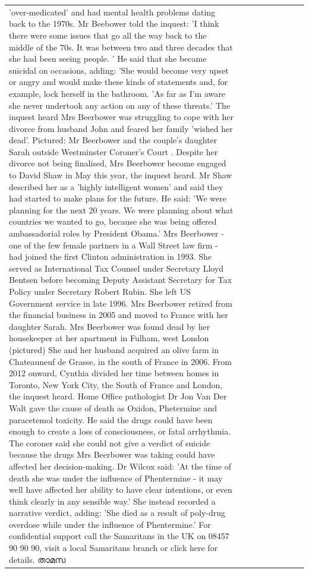 \begin{table}[H]
\begin{tabular}{lllrlllll}
'over-medicated' and had mental health problems dating back to the 1970s. Mr Beebower told the inquest: 'I think there were some issues that go all the way back to the middle of the 70s. It was between two and three decades that she had been seeing people. ' He said that she became suicidal on occasions, adding: 'She would become very upset or angry and would make these kinds of statements and, for example, lock herself in the bathroom. 'As far as I'm aware she never undertook any action on any of these threats.' The inquest heard Mrs Beerbower was struggling to cope with her divorce from husband John and feared her family 'wished her dead'. Pictured: Mr Beerbower and the couple's daughter Sarah outside Westminster Coroner's Court . Despite her divorce not being finalised, Mrs Beerbower become engaged to David Shaw in May this year, the inquest heard. Mr Shaw described her as a 'highly intelligent women' and said they had started to make plans for the future. He said: 'We were planning for the next 20 years. We were planning about what countries we wanted to go, because she was being offered ambassadorial roles by President Obama.' Mrs Beerbower - one of the few female partners in a Wall Street law firm - had joined the first Clinton administration in 1993. She served as International Tax Counsel under Secretary Lloyd Bentsen before becoming Deputy Assistant Secretary for Tax Policy under Secretary Robert Rubin. She left US Government service in late 1996. Mrs Beerbower retired from the financial business in 2005 and moved to France with her daughter Sarah. Mrs Beerbower was found dead by her housekeeper at her apartment in Fulham, west London (pictured) She and her husband acquired an olive farm in Chateauneuf de Grasse, in the south of France in 2006. From 2012 onward, Cynthia divided her time between homes in Toronto, New York City, the South of France and London, the inquest heard. Home Office pathologist Dr Jon Van Der Walt gave the cause of death as Oxidon, Phetermine and paracetemol toxicity. He said the drugs could have been enough to create a loss of consciousness, or fatal arrhythmia. The coroner said she could not give a verdict of suicide because the drugs Mrs Beerbower was taking could have affected her decision-making. Dr Wilcox said: 'At the time of death she was under the influence of Phentermine - it may well have affected her ability to have clear intentions, or even think clearly in any sensible way.' She instead recorded a narrative verdict, adding: 'She died as a result of poly-drug overdose while under the influence of Phentermine.' For confidential support call the Samaritans in the UK on 08457 90 90 90, visit a local Samaritans branch or click here for details. താമസ \\

\end{tabular}
\end{table}

